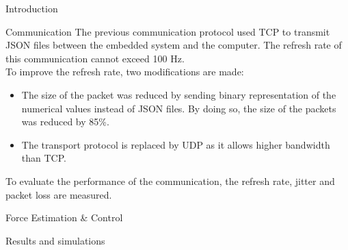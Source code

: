 \documentclass[a0paper,landscape]{baposter}
\begin{document}
\begin{poster}
\begin{posterbox}[name=intro,column=0]{Introduction}

%
\end{posterbox}

%  

\begin{posterbox}[name=communication,below=intro,above=bottom]{Communication}
	\vspace{5mm}
The previous communication protocol used TCP to transmit JSON files between the embedded system and the computer. The refresh rate of this communication cannot exceed 100 Hz.\\
To improve the refresh rate, two modifications are made:
\vspace{5mm}
\begin{itemize}
\item The size of the packet was reduced by sending binary representation of the numerical values instead of JSON files. By doing so, the size of the packets was reduced by 85\%.
\item The transport protocol is replaced by UDP as it allows higher bandwidth than TCP.
\end{itemize}
\vspace{5mm}
To evaluate the performance of the communication, the refresh rate, jitter and packet loss are measured.


	
\end{posterbox}



\begin{posterbox}[name=Control,column=1,span=2]{Force Estimation \& Control}



     



\end{posterbox}

\begin{posterbox}[name=results_and_simulations,column=1,span=2,below=Control,above=bottom]{Results and simulations}
% 
\end{posterbox}


\end{poster}
\end{document}
